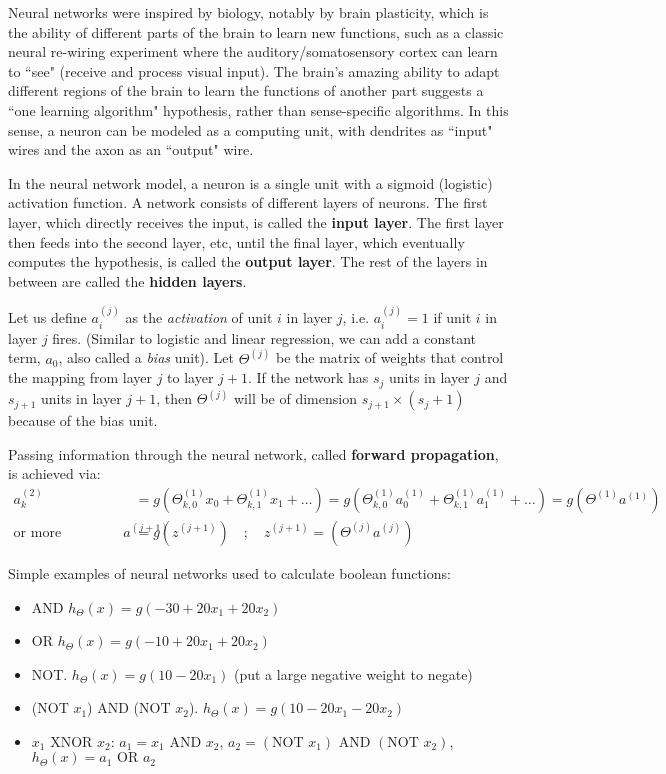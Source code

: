 \documentclass[letterpaper,10pt]{article}
\begin{document}
Neural networks were inspired by biology, notably by brain plasticity, which is the ability of different parts of the brain to learn new functions, such as a classic neural re-wiring experiment where the auditory/somatosensory cortex can learn to ``see" (receive and process visual input). The brain's amazing ability to adapt different regions of the brain to learn the functions of another part suggests a ``one learning algorithm" hypothesis, rather than sense-specific algorithms. In this sense, a neuron can be modeled as a computing unit, with dendrites as ``input" wires and the axon as an ``output" wire.

In the neural network model, a neuron is a single unit with a sigmoid (logistic) activation function. A network consists of different layers of neurons. The first layer, which directly receives the input, is called the \textbf{input layer}. The first layer then feeds into the second layer, etc, until the final layer, which eventually computes the hypothesis, is called the \textbf{output layer}. The rest of the layers in between are called the \textbf{hidden layers}.

Let us define $a_i^{(j)}$ as the \textit{activation} of unit $i$ in layer $j$, i.e. $a_i^{(j)} = 1$ if unit $i$ in layer $j$ fires. (Similar to logistic and linear regression, we can add a constant term, $a_0$, also called a \textit{bias} unit). Let $\Theta^{(j)}$ be the matrix of weights that control the mapping from layer $j$ to layer $j+1$. If the network has $s_j$ units in layer $j$ and $s_{j+1}$ units in layer $j+1$, then $\Theta^{(j)}$ will be of dimension $s_{j+1} \times (s_j + 1)$ because of the bias unit.

Passing information through the neural network, called \textbf{forward propagation}, is achieved via:
\begin{align}
a_k^{(2)} &= g\left( \Theta^{(1)}_{k,0} x_0 + \Theta^{(1)}_{k,1} x_1 + \ldots \right) = g\left( \Theta^{(1)}_{k,0} a^{(1)}_0 + \Theta^{(1)}_{k,1} a^{(1)}_1 + \ldots \right) = g\left( \Theta^{(1)} a^{(1)} \right) \\
\text{or more generally, }  a^{(j+1)} &= g\left( z^{(j+1)} \right) \quad ; \quad z^{(j+1)} = \left( \Theta^{(j)} a^{(j)} \right)
\end{align}


Simple examples of neural networks used to calculate boolean functions:
	\begin{itemize}
	\item AND $h_\Theta (x) = g(-30 + 20x_1 + 20x_2)$ 
	\item OR $h_\Theta (x) = g(-10 + 20x_1 + 20x_2)$
	\item NOT. $h_\Theta (x) = g(10 - 20x_1)$ (put a large negative weight to negate)
	\item (NOT $x_1$) AND (NOT $x_2$). $h_\Theta (x) = g(10 - 20x_1 - 20x_2)$
	\item $x_1 \text{ XNOR } x_2$: $a_1 = x_1 \text{ AND } x_2$, $a_2 = (\text{NOT }x_1) \text{ AND } (\text{NOT }x_2)$, $h_\Theta (x) = a_1 \text{ OR } a_2$
	\end{itemize}
\end{document}
